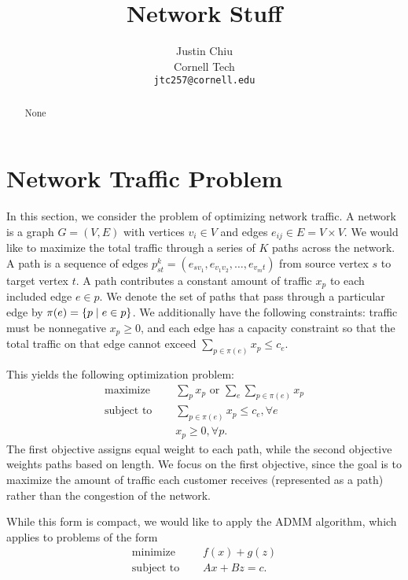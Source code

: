 \documentclass[11pt]{article}
\title{Network Stuff}
\author{Justin Chiu \\
  Cornell Tech \\
  \texttt{jtc257@cornell.edu}}
\begin{document}
\maketitle
\begin{abstract}
None
\end{abstract}

\section{Network Traffic Problem}
In this section, we consider the problem of optimizing network traffic.
A network is a graph $G = (V,E)$ with vertices $v_i\in V$ and edges
$e_{ij}\in E = V\times V$.
We would like to maximize the total traffic through a series of $K$ paths across the network.
A path is a sequence of edges $p_{st}^k = (e_{sv_1},e_{v_1v_2},\ldots,e_{v_mt})$
from source vertex $s$ to target vertex $t$.
A path contributes a constant amount of traffic $x_p$ to each included edge $e\in p$.
We denote the set of paths that pass through a particular edge by
$\pi(e) = \left\{p \mid e \in p\right\}$.
We additionally have the following constraints: traffic must be nonnegative $x_p \geq 0$,
and each edge has a capacity constraint so that the total traffic on that
edge cannot exceed $\sum_{p\in\pi(e)} x_p \le c_e$.

This yields the following optimization problem:
\begin{equation}
\label{eqn:network-opt}
\begin{aligned}
\textrm{maximize } \quad & \sum_{p} x_p \textrm{ or } \sum_{e} \sum_{p\in\pi(e)}x_{p}\\
\textrm{subject to } \quad &\sum_{p\in\pi(e)}x_p \le c_e, \forall e\\
& x_p \geq 0, \forall p.
\end{aligned}
\end{equation}
The first objective assigns equal weight to each path, while the second
objective weights paths based on length.
We focus on the first objective, since the goal is to maximize the amount of traffic
each customer receives (represented as a path) rather than the congestion
of the network.

While this form is compact, we would like to apply the ADMM algorithm,
which applies to problems of the form
\begin{equation}
\label{eqn:admm}
\begin{aligned}
\textrm{minimize } \quad & f(x) + g(z)\\
\textrm{subject to } \quad & Ax + Bz = c.
\end{aligned}
\end{equation}
\end{document}
